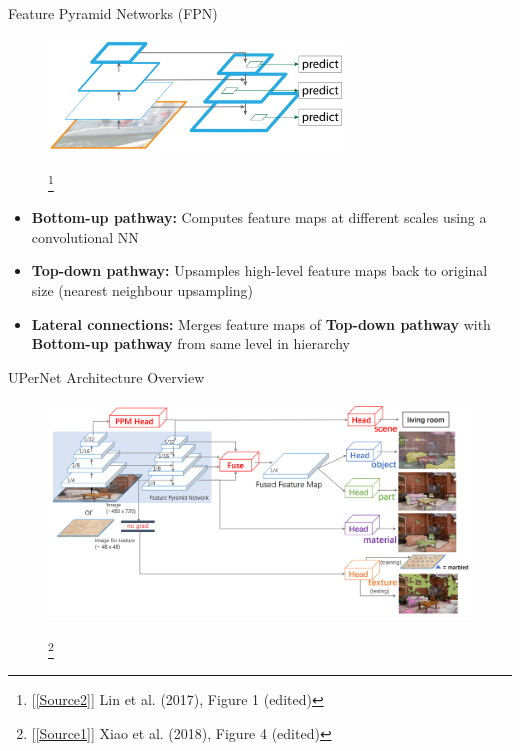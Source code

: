 \documentclass{beamer}
\newcommand\blfootnote[1]{
  \begingroup
  \renewcommand\thefootnote{}\footnote{#1}
  \addtocounter{footnote}{-1}
  \endgroup
}
\begin{document}

\begin{frame}{Feature Pyramid Networks (FPN)}
    \begin{figure}
        \centering
        \includegraphics[width=0.7\textwidth]{Images/FPNOverview.png}
        \blfootnote{[\ref{Source2}] Lin et al. (2017), Figure 1 (edited)}
    \end{figure}
    \vspace{-0.5 cm}
    \begin{itemize}
        \item \textbf{Bottom-up pathway:} Computes feature maps at different scales using a convolutional NN
        \item \textbf{Top-down pathway:} Upsamples high-level feature maps back to original size (nearest neighbour upsampling)
        \item \textbf{Lateral connections:} Merges feature maps of \textbf{Top-down pathway} with \textbf{Bottom-up pathway} from same level in hierarchy
    \end{itemize}
\end{frame}


\begin{frame}{UPerNet Architecture Overview}
    \begin{figure}
        \centering
        \includegraphics[width=\textwidth]{Images/UPerNetArchitectureOverview_noHeads.png}
        \blfootnote{[\ref{Source1}] Xiao et al. (2018), Figure 4 (edited)}
    \end{figure}
\end{frame}
\end{document}
